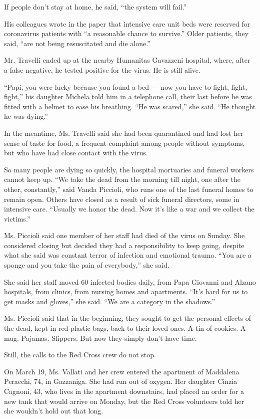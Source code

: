If people don't stay at home, he said, ``the system will fail.''

His colleagues wrote in the paper that intensive care unit beds were
reserved for coronavirus patients with ``a reasonable chance to
survive.'' Older patients, they said, ``are not being resuscitated and
die alone.''

Mr. Travelli ended up at the nearby Humanitas Gavazzeni hospital, where,
after a false negative, he tested positive for the virus. He is still
alive.

``Papi, you were lucky because you found a bed --- now you have to
fight, fight, fight,'' his daughter Michela told him in a telephone
call, their last before he was fitted with a helmet to ease his
breathing. ``He was scared,'' she said. ``He thought he was dying.''

In the meantime, Ms. Travelli said she had been quarantined and had lost
her sense of taste for food, a frequent complaint among people without
symptoms, but who have had close contact with the virus.

So many people are dying so quickly, the hospital mortuaries and funeral
workers cannot keep up. ``We take the dead from the morning till night,
one after the other, constantly,'' said Vanda Piccioli, who runs one of
the last funeral homes to remain open. Others have closed as a result of
sick funeral directors, some in intensive care. ``Usually we honor the
dead. Now it's like a war and we collect the victims.''

Ms. Piccioli said one member of her staff had died of the virus on
Sunday. She considered closing but decided they had a responsibility to
keep going, despite what she said was constant terror of infection and
emotional trauma. ``You are a sponge and you take the pain of
everybody,'' she said.

She said her staff moved 60 infected bodies daily, from Papa Giovanni
and Alzano hospitals, from clinics, from nursing homes and apartments.
``It's hard for us to get masks and gloves,'' she said. ``We are a
category in the shadows.''

Ms. Piccioli said that in the beginning, they sought to get the personal
effects of the dead, kept in red plastic bags, back to their loved ones.
A tin of cookies. A mug. Pajamas. Slippers. But now they simply don't
have time.

Still, the calls to the Red Cross crew do not stop.

On March 19, Ms. Vallati and her crew entered the apartment of Maddalena
Peracchi, 74, in Gazzaniga. She had run out of oxygen. Her daughter
Cinzia Cagnoni, 43, who lives in the apartment downstairs, had placed an
order for a new tank that would arrive on Monday, but the Red Cross
volunteers told her she wouldn't hold out that long.

